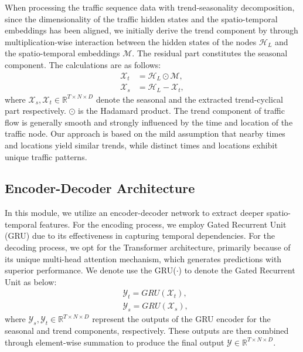 When processing the traffic sequence data with trend-seasonality decomposition, since the dimensionality of the traffic hidden states and the spatio-temporal embeddings has been aligned, we initially derive the trend component by through multiplication-wise interaction between the hidden states of the nodes $\bm{\mathcal{H}}_L$ and the spatio-temporal embeddings $\bm{\mathcal{M}}$. The residual part constitutes the seasonal component. The calculations are as follows:
\begin{equation}
    \begin{aligned}
        \bm{\mathcal{X}}_{t}& = \bm{\mathcal{H}}_L \odot \bm{\mathcal{M}}, \\ 
        \bm{\mathcal{X}}_{s}& = \bm{\mathcal{H}}_L - \bm{\mathcal{X}}_{t},
    \end{aligned}
\end{equation}
where $\bm{\mathcal{X}}_{s}, \bm{\mathcal{X}}_{t} \in \mathbb{R}^{T\times N\times D}$ denote the seasonal and the extracted trend-cyclical part respectively. $\odot$ is the Hadamard product. The trend component of traffic flow is generally smooth and strongly influenced by the time and location of the traffic node. Our approach is based on the mild assumption that nearby times and locations yield similar trends, while distinct times and locations exhibit unique traffic patterns.

\subsection{Encoder-Decoder Architecture}
In this module, we utilize an encoder-decoder network to extract deeper spatio-temporal features. For the encoding process, we employ Gated Recurrent Unit (GRU) due to its effectiveness in capturing temporal dependencies. For the decoding process, we opt for the Transformer architecture, primarily because of its unique multi-head attention mechanism, which generates predictions with superior performance. We denote use the GRU($\cdot$) to denote the Gated Recurrent Unit as below:
\begin{equation}
    \begin{aligned} 
        &\bm{\mathcal{Y}}_{t} = GRU(\bm{\mathcal{X}}_{t}), \\
        &\bm{\mathcal{Y}}_{s} = GRU(\bm{\mathcal{X}}_{s}), 
    \end{aligned}
\end{equation}
where $\bm{\mathcal{Y}}_{s}, \bm{\mathcal{Y}}_{t} \in \mathbb{R}^{T\times N\times D}$ represent the outputs of the GRU encoder for the seasonal and trend components, respectively. These outputs are then combined through element-wise summation to produce the final output $\bm{\mathcal{Y}} \in \mathbb{R}^{T\times N\times D}$.

